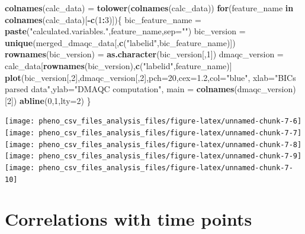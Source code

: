 \documentclass[]{article}
\newenvironment{Shaded}{\begin{snugshade}}{\end{snugshade}}
\newcommand{\KeywordTok}[1]{\textcolor[rgb]{0.13,0.29,0.53}{\textbf{#1}}}
\newcommand{\DataTypeTok}[1]{\textcolor[rgb]{0.13,0.29,0.53}{#1}}
\newcommand{\DecValTok}[1]{\textcolor[rgb]{0.00,0.00,0.81}{#1}}
\newcommand{\FloatTok}[1]{\textcolor[rgb]{0.00,0.00,0.81}{#1}}
\newcommand{\StringTok}[1]{\textcolor[rgb]{0.31,0.60,0.02}{#1}}
\newcommand{\ControlFlowTok}[1]{\textcolor[rgb]{0.13,0.29,0.53}{\textbf{#1}}}
\newcommand{\OperatorTok}[1]{\textcolor[rgb]{0.81,0.36,0.00}{\textbf{#1}}}
\newcommand{\NormalTok}[1]{#1}
\begin{document}
\begin{Shaded}
\begin{Highlighting}[]
\KeywordTok{colnames}\NormalTok{(calc_data) =}\StringTok{ }\KeywordTok{tolower}\NormalTok{(}\KeywordTok{colnames}\NormalTok{(calc_data))}
\ControlFlowTok{for}\NormalTok{(feature_name }\ControlFlowTok{in} \KeywordTok{colnames}\NormalTok{(calc_data)[}\OperatorTok{-}\KeywordTok{c}\NormalTok{(}\DecValTok{1}\OperatorTok{:}\DecValTok{3}\NormalTok{)])\{}
\NormalTok{  bic_feature_name =}\StringTok{ }\KeywordTok{paste}\NormalTok{(}\StringTok{"calculated.variables."}\NormalTok{,feature_name,}\DataTypeTok{sep=}\StringTok{""}\NormalTok{)}
\NormalTok{  bic_version =}\StringTok{ }\KeywordTok{unique}\NormalTok{(merged_dmaqc_data[,}\KeywordTok{c}\NormalTok{(}\StringTok{"labelid"}\NormalTok{,bic_feature_name)])}
  \KeywordTok{rownames}\NormalTok{(bic_version) =}\StringTok{ }\KeywordTok{as.character}\NormalTok{(bic_version[,}\DecValTok{1}\NormalTok{])}
\NormalTok{  dmaqc_version =}\StringTok{ }\NormalTok{calc_data[}\KeywordTok{rownames}\NormalTok{(bic_version),}\KeywordTok{c}\NormalTok{(}\StringTok{"labelid"}\NormalTok{,feature_name)]}
  \KeywordTok{plot}\NormalTok{(bic_version[,}\DecValTok{2}\NormalTok{],dmaqc_version[,}\DecValTok{2}\NormalTok{],}\DataTypeTok{pch=}\DecValTok{20}\NormalTok{,}\DataTypeTok{cex=}\FloatTok{1.2}\NormalTok{,}\DataTypeTok{col=}\StringTok{"blue"}\NormalTok{,}
       \DataTypeTok{xlab=}\StringTok{"BICs parsed data"}\NormalTok{,}\DataTypeTok{ylab=}\StringTok{"DMAQC computation"}\NormalTok{,}
       \DataTypeTok{main =} \KeywordTok{colnames}\NormalTok{(dmaqc_version)[}\DecValTok{2}\NormalTok{])}
  \KeywordTok{abline}\NormalTok{(}\DecValTok{0}\NormalTok{,}\DecValTok{1}\NormalTok{,}\DataTypeTok{lty=}\DecValTok{2}\NormalTok{)}
\NormalTok{\}}
\end{Highlighting}
\end{Shaded}

\texttt{[image: pheno\_csv\_files\_analysis\_files/figure-latex/unnamed-chunk-7-6]}
\texttt{[image: pheno\_csv\_files\_analysis\_files/figure-latex/unnamed-chunk-7-7]}
\texttt{[image: pheno\_csv\_files\_analysis\_files/figure-latex/unnamed-chunk-7-8]}
\texttt{[image: pheno\_csv\_files\_analysis\_files/figure-latex/unnamed-chunk-7-9]}
\texttt{[image: pheno\_csv\_files\_analysis\_files/figure-latex/unnamed-chunk-7-10]}

\section{Correlations with time
points}\label{correlations-with-time-points}
\end{document}
